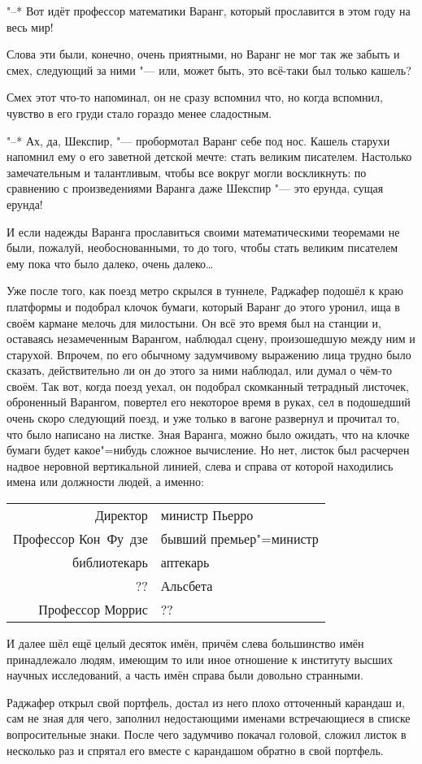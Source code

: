 "--* Вот идёт профессор математики Варанг, который прославится в этом году на
весь мир!

Слова эти были, конечно, очень приятными, но Варанг не мог так же забыть и смех,
следующий за ними "--- или, может быть, это всё-таки был только кашель?

Смех этот что-то напоминал, он не сразу вспомнил что, но когда вспомнил, чувство
в его груди стало гораздо менее сладостным.

"--* Ах, да, Шекспир, "--- пробормотал Варанг себе под нос.
Кашель старухи напомнил ему о его заветной детской мечте: стать великим
писателем.
Настолько замечательным и талантливым, чтобы все вокруг могли воскликнуть: по
сравнению с произведениями Варанга даже Шекспир "--- это ерунда, сущая ерунда!

И если надежды Варанга прославиться своими математическими теоремами не были,
пожалуй, необоснованными, то до того, чтобы стать великим писателем ему пока что
было далеко, очень далеко\ldots

Уже после того, как поезд метро скрылся в туннеле, Раджафер подошёл к краю
платформы и подобрал клочок бумаги, который Варанг до этого уронил, ища в своём
кармане мелочь для милостыни.
Он всё это время был на станции и, оставаясь незамеченным Варангом, наблюдал
сцену, произошедшую между ним и старухой.
Впрочем, по его обычному задумчивому выражению лица трудно было сказать,
действительно ли он до этого за ними наблюдал, или думал о чём-то своём.
Так вот, когда поезд уехал, он подобрал скомканный тетрадный листочек,
оброненный Варангом, повертел его некоторое время в руках, сел в подошедший
очень скоро следующий поезд, и уже только в вагоне развернул и прочитал то, что
было написано на листке.
Зная Варанга, можно было ожидать, что на клочке бумаги будет какое"=нибудь
сложное вычисление.
Но нет, листок был расчерчен надвое неровной вертикальной линией, слева и справа
от которой находились имена или должности людей, а именно:

\begin{table}[h!]
\centering
\begin{tabular}{r|l}
Директор             & министр Пьерро \\
Профессор Кон~Фу~дзе & бывший премьер"=министр \\
библиотекарь         & аптекарь \\
??                   & Альсбета \\
Профессор Моррис     & ?? \\
\end{tabular}
\end{table}

И далее шёл ещё целый десяток имён, причём слева большинство имён принадлежало
людям, имеющим то или иное отношение к институту высших научных исследований, а
часть имён справа были довольно странными.

Раджафер открыл свой портфель, достал из него плохо отточенный карандаш и, сам не
зная для чего, заполнил недостающими именами встречающиеся в списке
вопросительные знаки.
После чего задумчиво покачал головой, сложил листок в несколько раз и спрятал
его вместе с карандашом обратно в свой портфель.
